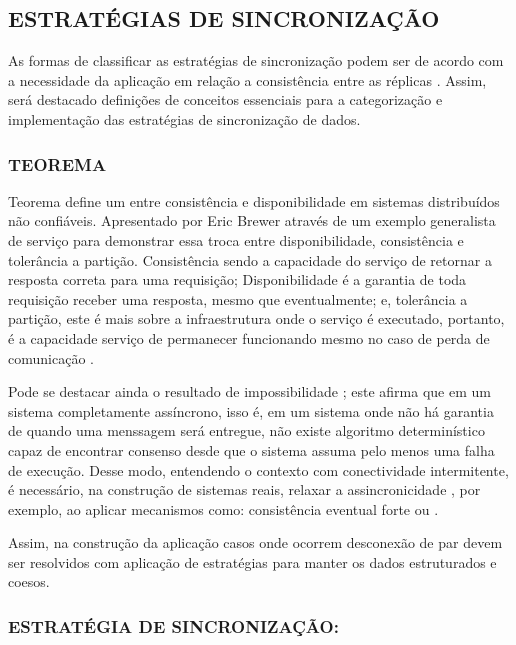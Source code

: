 \subsection{ESTRATÉGIAS DE SINCRONIZAÇÃO}

As formas de classificar as estratégias de sincronização podem ser de acordo com a necessidade da aplicação em relação a consistência entre as réplicas \cite{tanenbaum2007dist}. Assim, será destacado definições de conceitos essenciais para a categorização e implementação das estratégias de sincronização de dados. 

\subsubsection{TEOREMA }

Teorema  define um  entre consistência e disponibilidade em sistemas distribuídos não confiáveis. Apresentado por Eric Brewer através de um exemplo generalista de serviço  para demonstrar essa troca entre disponibilidade, consistência e tolerância a partição. Consistência sendo a capacidade do serviço de retornar a resposta correta para uma requisição; Disponibilidade é a garantia de toda requisição receber uma resposta, mesmo que eventualmente; e, tolerância a partição, este é mais sobre a infraestrutura onde o serviço é executado, portanto, é a capacidade serviço de permanecer funcionando mesmo no caso de perda de comunicação \cite{CAPtheorem2012}.

Pode se destacar ainda o resultado de impossibilidade ; este afirma que em um sistema completamente assíncrono, isso é, em um sistema onde não há garantia de quando uma menssagem será entregue, não existe algoritmo determinístico capaz de encontrar consenso desde que o sistema assuma pelo menos uma falha de execução. Desse modo, entendendo o contexto com conectividade intermitente, é necessário, na construção de sistemas reais, relaxar a assincronicidade \cite{FLP1985}, por exemplo, ao aplicar mecanismos como: consistência eventual forte \cite{Gomes2017VerifyingSEC} ou .

Assim, na construção da aplicação casos onde ocorrem desconexão de par devem ser resolvidos com aplicação de estratégias para manter os dados estruturados e coesos.

\subsubsection{ESTRATÉGIA DE SINCRONIZAÇÃO: }

